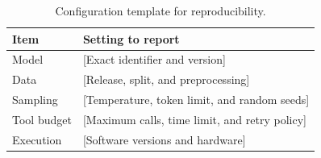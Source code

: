 \begin{table}[H]
  \centering
  \caption{Configuration template for reproducibility.}
  \label{tab:settings}
  \small
  \renewcommand{\arraystretch}{1.15}
  \setlength{\tabcolsep}{5pt}
  \begin{tabularx}{\linewidth}{lX}
    \toprule
    \textbf{Item} & \textbf{Setting to report} \\
    \midrule
    Model & [Exact identifier and version] \\
    Data & [Release, split, and preprocessing] \\
    Sampling & [Temperature, token limit, and random seeds] \\
    Tool budget & [Maximum calls, time limit, and retry policy] \\
    Execution & [Software versions and hardware] \\
    \bottomrule
  \end{tabularx}
\end{table}
